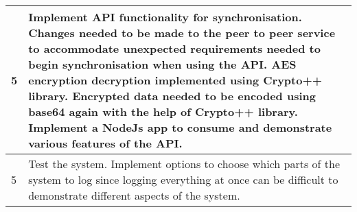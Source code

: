 \begin{enumerate}
\begin{table}[h]
\begin{tabular}{|p{1cm}|p{12cm}|}
\hline 5 & Implement API functionality for synchronisation. Changes needed to be made to the peer to peer service to accommodate unexpected requirements needed to begin synchronisation when using the API. AES encryption decryption implemented using Crypto++ \cite{cryptopp} library. Encrypted data needed to be encoded using base64 again with the help of Crypto++ library. Implement a NodeJs app to consume and demonstrate various features of the API.\\ [12pt]

\hline 5 & Test the system. Implement options to choose which parts of the system to log since logging everything at once can be difficult to demonstrate different aspects of the system. \\ [12pt]

\hline
\end{tabular} \\
\label{tab:ProjRisks}
\end{table}

\FloatBarrier




\end{enumerate}
